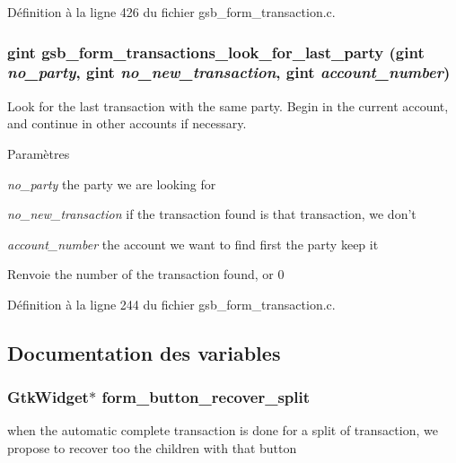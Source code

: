 Définition à la ligne 426 du fichier gsb\_\-form\_\-transaction.c.

\subsubsection[{gsb\_\-form\_\-transactions\_\-look\_\-for\_\-last\_\-party}]{\setlength{\rightskip}{0pt plus 5cm}gint gsb\_\-form\_\-transactions\_\-look\_\-for\_\-last\_\-party (gint {\em no\_\-party}, \/  gint {\em no\_\-new\_\-transaction}, \/  gint {\em account\_\-number})}\label{gsb__form__transaction_8c_a94d3117aba63e480771a5f124c4dc459}
Look for the last transaction with the same party. Begin in the current account, and continue in other accounts if necessary.


\begin{DoxyParams}{Paramètres}
\item[{\em no\_\-party}]the party we are looking for \item[{\em no\_\-new\_\-transaction}]if the transaction found is that transaction, we don't \item[{\em account\_\-number}]the account we want to find first the party keep it\end{DoxyParams}
\begin{DoxyReturn}{Renvoie}
the number of the transaction found, or 0 
\end{DoxyReturn}


Définition à la ligne 244 du fichier gsb\_\-form\_\-transaction.c.



\subsection{Documentation des variables}
\subsubsection[{form\_\-button\_\-recover\_\-split}]{\setlength{\rightskip}{0pt plus 5cm}GtkWidget$\ast$ {\bf form\_\-button\_\-recover\_\-split}}\label{gsb__form__transaction_8c_af81e5fbecc574bc2c21efba526f63fbd}
when the automatic complete transaction is done for a split of transaction, we propose to recover too the children with that button 

